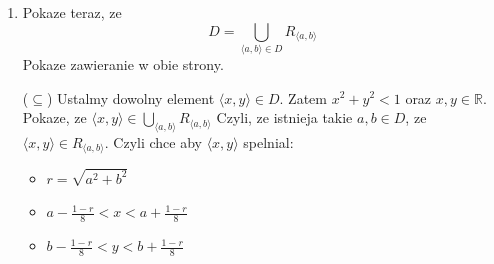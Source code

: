 \documentclass{article}
\begin{document}
\begin{enumerate}[align=left]
\begin{enumerate}
                Aby pokazac, ze $R_{\langle a, b \rangle} \subset D$, pokaze ze $\langle x , y \rangle \in D$. Zauwazmy ze:

                $(a + \frac{1-r}{8})^{2} + (b + \frac{1-r}{8})^{2} <$

               $(a + (1-r))^{2} + (b + (1-r)^{2}) = $

                $a^{2} + 2a(1-r) + (1-r)^{2} + b^{2} + 2b(1-r) + (1-r)^{2} =$

                $a^{2} + 2a - 2ar + 1 - 2r + r^{2} + b^{2} + 2b - 2br + 1 - 2r + r^{2} \overset{\mathrm{(r^{2} = a^{2} + b^{2})}}{=}$

               $a^{2} + 2a - 2ar + 1 - 2r + a^{2} + b^{2} + b^{2} + 2b - 2br + 1 - 2r + a^{2} + b^{2} \overset{\mathrm{(a^{2} + b^{2} < 1)}}{=}$

               $ 2a - 2ar + 1 - 2r + 1 + 1 + 2b - 2br + 1 - 2r + 1 =$

                $2a - 2ar - 4r + 2b - 2br + 5 =$

               $ 2(a + b) - r(2a + 2b + 4) + 5 \overset{\mathrm{(r < 1)}}{<}$

                $2a + 2b - (2a + 2b + 4) + 5 =$

                $2a + 2b - 2a -2b - 4 + 5 = 1$ 

Zatem punkt $\langle x, y\rangle \in D$. Z dowolnosci wyboru punkty $\langle x , y \rangle \in R_{\langle a, b \rangle}$ wnioskujemy, ze $R_{\langle a,b \rangle} \subset D$

\item Pokaze teraz, ze $$D = \bigcup\limits_{\langle a,b \rangle \in D}R_{\langle a,b \rangle}$$
Pokaze zawieranie w obie strony.

                ($\subseteq$)              
                Ustalmy dowolny element $\langle x, y \rangle \in D$. Zatem $x^{2} + y^{2} < 1$ oraz $x,y \in \mathbb{R}$. Pokaze, ze $\langle x, y \rangle \in \bigcup\limits_{\langle a,b \rangle}R_{\langle a,b \rangle}$ Czyli, ze istnieja takie $a,b \in D$, ze $\langle x, y\rangle \in R_{\langle a,b \rangle}$. Czyli chce aby $\langle x, y \rangle$ spelnial:
                \begin{itemize}
                    \item $r = \sqrt{a^{2} + b ^{2}}$
                    \item $a - \frac{1-r}{8} < x < a + \frac{1-r}{8}$ 
                    \item $b - \frac{1-r}{8} < y < b + \frac{1-r}{8}$ 
                    

\end{itemize}
\end{enumerate}
\end{enumerate}
\end{document}
